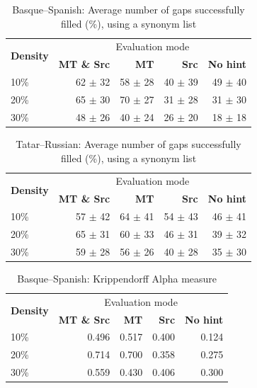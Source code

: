 \documentclass[11pt]{article}
\begin{document}

\begin{table}
\centering
  \begin{tabular}{|l|r|r|r|r|}
  \hline
 \multirow{2}{*}{\textbf{Density}} & \multicolumn{4}{|c|}{Evaluation mode} \\\cline{2-5}
                                            & \textbf{MT \& Src} & \textbf{MT} & \textbf{Src} & \textbf{No hint} \\
\hline
10\%&62 \(\pm\) 32&58 \(\pm\) 28&40 \(\pm\) 39&49 \(\pm\) 40\\
20\%&65 \(\pm\) 30&70 \(\pm\) 27&31 \(\pm\) 28&31 \(\pm\) 30\\
30\%&48 \(\pm\) 26&40 \(\pm\) 24&26 \(\pm\) 20&18 \(\pm\) 18\\
\hline
\end{tabular}
\caption {Basque--Spanish: Average number of gaps successfully filled (\%), using a synonym list} 
\label{table:res-eus-spa}
\end{table}

\begin{table}
\centering
  \begin{tabular}{|l|r|r|r|r|}
    \hline
    \multirow{2}{*}{\textbf{Density}} & \multicolumn{4}{|c|}{Evaluation mode} \\\cline{2-5}
                                            & \textbf{MT \& Src} & \textbf{MT} & \textbf{Src} & \textbf{No hint} \\
\hline
10\%&57 \(\pm\) 42&64 \(\pm\) 41&54 \(\pm\) 43&46 \(\pm\) 41\\
20\%&65 \(\pm\) 31&60 \(\pm\) 33&46 \(\pm\) 31&39 \(\pm\) 32\\
30\%&59 \(\pm\) 28&56 \(\pm\) 26&40 \(\pm\) 28&35 \(\pm\) 30\\
    \hline
  \end{tabular}
  \caption{Tatar--Russian: Average number of gaps successfully filled (\%), using a synonym list}
  \label{table:res-tat-rus}
\end{table}

\begin{table}
\centering
  \begin{tabular}{|l|r|r|r|r|}
  \hline
 \multirow{2}{*}{\textbf{Density}} & \multicolumn{4}{|c|}{Evaluation mode} \\\cline{2-5}
                                            & \textbf{MT \& Src} & \textbf{MT} & \textbf{Src} & \textbf{No hint} \\
\hline
10\%&0.496&0.517&0.400&0.124\\
20\%&0.714&0.700&0.358&0.275\\
30\%&0.559&0.430&0.406&0.300\\

\hline
\end{tabular}
\caption {Basque--Spanish: Krippendorff Alpha measure} 
\label{table:alpha-eus-spa}
\end{table}
\end{document}
